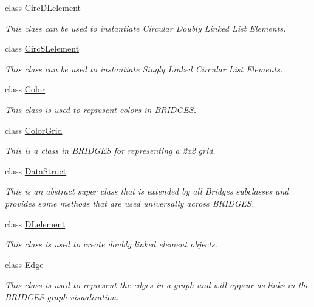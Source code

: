\begin{DoxyCompactItemize}
class \mbox{\hyperlink{classbridges_1_1base_1_1_circ_d_lelement}{Circ\+D\+Lelement}}
\begin{DoxyCompactList}\small\item\em This class can be used to instantiate Circular Doubly Linked List Elements. \end{DoxyCompactList}\item 
class \mbox{\hyperlink{classbridges_1_1base_1_1_circ_s_lelement}{Circ\+S\+Lelement}}
\begin{DoxyCompactList}\small\item\em This class can be used to instantiate Singly Linked Circular List Elements. \end{DoxyCompactList}\item 
class \mbox{\hyperlink{classbridges_1_1base_1_1_color}{Color}}
\begin{DoxyCompactList}\small\item\em This class is used to represent colors in B\+R\+I\+D\+G\+ES. \end{DoxyCompactList}\item 
class \mbox{\hyperlink{classbridges_1_1base_1_1_color_grid}{Color\+Grid}}
\begin{DoxyCompactList}\small\item\em This is a class in B\+R\+I\+D\+G\+ES for representing a 2x2 grid. \end{DoxyCompactList}\item 
class \mbox{\hyperlink{classbridges_1_1base_1_1_data_struct}{Data\+Struct}}
\begin{DoxyCompactList}\small\item\em This is an abstract super class that is extended by all Bridges subclasses and provides some methods that are used universally across B\+R\+I\+D\+G\+ES. \end{DoxyCompactList}\item 
class \mbox{\hyperlink{classbridges_1_1base_1_1_d_lelement}{D\+Lelement}}
\begin{DoxyCompactList}\small\item\em This class is used to create doubly linked element objects. \end{DoxyCompactList}\item 
class \mbox{\hyperlink{classbridges_1_1base_1_1_edge}{Edge}}
\begin{DoxyCompactList}\small\item\em This class is used to represent the edges in a graph and will appear as links in the B\+R\+I\+D\+G\+ES graph visualization. \end{DoxyCompactList}\item 

\end{DoxyCompactItemize}
